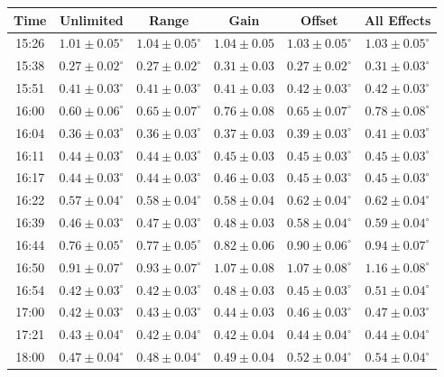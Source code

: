 {\begin{minipage}{\linewidth}
    \begin{tabular}{| c  c  c  c  c  c |}
	   \hline
       Time & Unlimited &  Range &  Gain &  Offset &  All Effects \\ \hline
15:26 & \(1.01\pm0.05^\circ\) & \(1.04\pm0.05^\circ\) & \(1.04\pm0.05\) & \(1.03\pm0.05^\circ\) & \(1.03\pm0.05^\circ\) \\
15:38 & \(0.27\pm0.02^\circ\) & \(0.27\pm0.02^\circ\) & \(0.31\pm0.03\) & \(0.27\pm0.02^\circ\) & \(0.31\pm0.03^\circ\) \\
15:51 & \(0.41\pm0.03^\circ\) & \(0.41\pm0.03^\circ\) & \(0.41\pm0.03\) & \(0.42\pm0.03^\circ\) & \(0.42\pm0.03^\circ\) \\
16:00 & \(0.60\pm0.06^\circ\) & \(0.65\pm0.07^\circ\) & \(0.76\pm0.08\) & \(0.65\pm0.07^\circ\) & \(0.78\pm0.08^\circ\) \\
16:04 & \(0.36\pm0.03^\circ\) & \(0.36\pm0.03^\circ\) & \(0.37\pm0.03\) & \(0.39\pm0.03^\circ\) & \(0.41\pm0.03^\circ\) \\
16:11 & \(0.44\pm0.03^\circ\) & \(0.44\pm0.03^\circ\) & \(0.45\pm0.03\) & \(0.45\pm0.03^\circ\) & \(0.45\pm0.03^\circ\) \\
16:17 & \(0.44\pm0.03^\circ\) & \(0.44\pm0.03^\circ\) & \(0.46\pm0.03\) & \(0.45\pm0.03^\circ\) & \(0.45\pm0.03^\circ\) \\
16:22 & \(0.57\pm0.04^\circ\) & \(0.58\pm0.04^\circ\) & \(0.58\pm0.04\) & \(0.62\pm0.04^\circ\) & \(0.62\pm0.04^\circ\) \\
16:39 & \(0.46\pm0.03^\circ\) & \(0.47\pm0.03^\circ\) & \(0.48\pm0.03\) & \(0.58\pm0.04^\circ\) & \(0.59\pm0.04^\circ\) \\
16:44 & \(0.76\pm0.05^\circ\) & \(0.77\pm0.05^\circ\) & \(0.82\pm0.06\) & \(0.90\pm0.06^\circ\) & \(0.94\pm0.07^\circ\) \\
16:50 & \(0.91\pm0.07^\circ\) & \(0.93\pm0.07^\circ\) & \(1.07\pm0.08\) & \(1.07\pm0.08^\circ\) & \(1.16\pm0.08^\circ\) \\
16:54 & \(0.42\pm0.03^\circ\) & \(0.42\pm0.03^\circ\) & \(0.48\pm0.03\) & \(0.45\pm0.03^\circ\) & \(0.51\pm0.04^\circ\) \\
17:00 & \(0.42\pm0.03^\circ\) & \(0.43\pm0.03^\circ\) & \(0.44\pm0.03\) & \(0.46\pm0.03^\circ\) & \(0.47\pm0.03^\circ\) \\
17:21 & \(0.43\pm0.04^\circ\) & \(0.42\pm0.04^\circ\) & \(0.42\pm0.04\) & \(0.44\pm0.04^\circ\) & \(0.44\pm0.04^\circ\) \\
18:00 & \(0.47\pm0.04^\circ\) & \(0.48\pm0.04^\circ\) & \(0.49\pm0.04\) & \(0.52\pm0.04^\circ\) & \(0.54\pm0.04^\circ\) \\ \hline
    \end{tabular}
  	\label{t:LongFFIndivSim}
\end{minipage}
\pagebreak
}

